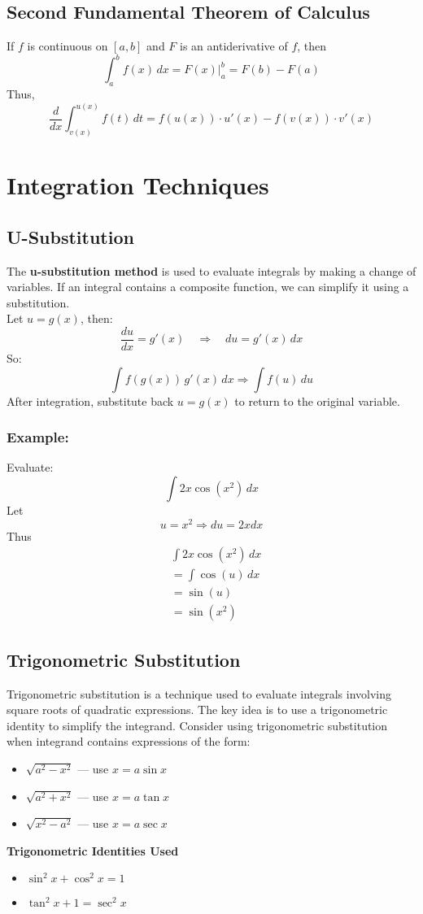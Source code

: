 \documentclass[11pt]{article}
\begin{document}
\subsection{Second Fundamental Theorem of Calculus}
If $f$ is continuous on $[a,b]$ and $F$ is an antiderivative of $f$, then
\[
    \int_a^bf(x)\,dx=\left.F(x)\right|_a^b=F(b)-F(a)
\]
Thus,
\[
    \boxed{
        \frac{d}{dx}\int_{v(x)}^{u(x)}f(t)\,dt=f(u(x))\cdot u'(x) - f(v(x)) \cdot v'(x)
    }
\]
\section{Integration Techniques}
\subsection{U-Substitution}
The \textbf{u-substitution method} is used to evaluate integrals by making a change of variables. 
If an integral contains a composite function, we can simplify it using a substitution.\\
Let $u = g(x)$, then:
\[
    \frac{du}{dx} = g'(x) \quad \Rightarrow \quad du = g'(x)\,dx
\]
So:
\[
    \int f(g(x))\,g'(x)\,dx \Rightarrow\int f(u)\,du
\]After integration, 
substitute back $u = g(x)$ to return to the original variable.
\subsubsection*{Example:}
Evaluate:
\[
    \int 2x\cos(x^2)\,dx
\]
Let
\[
    u=x^2\Rightarrow du=2xdx
\]
Thus
\[
    \begin{aligned}
        &\int 2x\cos(x^2)\,dx\\
        &= \int \cos(u)\,dx\\
        &= \sin(u)\\
        &= \sin(x^2)
    \end{aligned}
\]
\subsection{Trigonometric Substitution}
Trigonometric substitution is a technique used to evaluate integrals involving square roots of quadratic expressions. The key idea is to use a trigonometric identity to simplify the integrand.
Consider using trigonometric substitution when integrand contains expressions of the form:
\begin{itemize}
    \item $\sqrt{a^2 - x^2}$ — use $x = a \sin x$
    \item $\sqrt{a^2 + x^2}$ — use $x = a \tan x$
    \item $\sqrt{x^2 - a^2}$ — use $x = a \sec x$
\end{itemize}\textbf{Trigonometric Identities Used}
\begin{itemize}
    \item $\sin^2 x + \cos^2 x = 1$
    \item $\tan^2 x + 1 = \sec^2 x$
\end{itemize}
\end{document}
